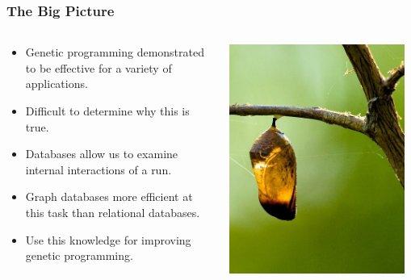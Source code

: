 \documentclass{beamer}
\begin{document}
\begin{frame}
  \frametitle{The Big Picture}
  
  \begin{columns}
  \begin{column}{0.6\textwidth}
  \begin{itemize}
	\item Genetic programming demonstrated to be effective for a variety of applications.
	\item Difficult to determine why this is true.
	\item Databases allow us to examine internal interactions of a run.
	\item Graph databases more efficient at this task than relational databases.
	\item Use this knowledge for improving genetic programming.
  \end{itemize}
  \end{column}
  \begin{column}{0.4\textwidth}
   \includegraphics[width=0.95\textwidth]{Illustrations/Empty_cocoon_crop_by_Bluedrakon_from_Flickr.jpg}
       \\
  \end{column}
  \end{columns}
\end{frame}
\end{document}

